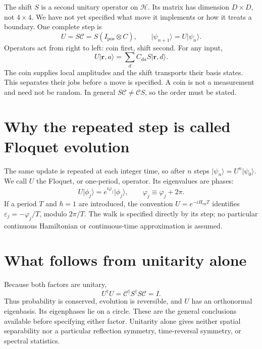 \documentclass[11pt,a4paper,oneside]{report}
\newcommand{\ket}[1]{\lvert #1\rangle}
\newcommand{\HH}{\mathcal H}
\newcommand{\CC}{\mathcal C}
\newcommand{\Id}{I}
\numberwithin{equation}{chapter}
\begin{document}
The shift \(S\) is a second unitary operator on \(\HH\). Its matrix
has dimension \(D\times D\), not \(4\times4\). We have not yet
specified what move it implements or how it treats a boundary.
One complete step is
\begin{equation}
\boxed{U=S\CC=S(\Id_{\mathrm{pos}}\otimes C),\qquad
\ket{\psi_{n+1}}=U\ket{\psi_n}.}
\label{eq:step}
\end{equation}
Operators act from right to left: coin first, shift second. For any input,
\begin{equation}
U\ket{\mathbf r,a}=\sum_d C_{da}S\ket{\mathbf r,d}.
\label{eq:componentstep}
\end{equation}
The coin supplies local amplitudes and the shift transports their basis
states. This separates their jobs before a move is specified. A coin
is not a measurement and need not be random.
In general \(S\CC\neq\CC S\), so the order must be stated.

\section{Why the repeated step is called Floquet evolution}

The same update is repeated at each integer time, so after \(n\)
steps \(\ket{\psi_n}=U^n\ket{\psi_0}\). We call \(U\) the
Floquet, or one-period, operator. Its eigenvalues are phases:
\begin{equation}
U\ket{\phi_j}=e^{i\varphi_j}\ket{\phi_j},\qquad
\varphi_j\equiv\varphi_j+2\pi.
\end{equation}
If a period \(T\) and \(\hbar=1\) are introduced, the convention
\(U=e^{-iH_{\mathrm{eff}}T}\) identifies
\(\varepsilon_j=-\varphi_j/T\), modulo \(2\pi/T\). The walk is
specified directly by its step; no particular continuous Hamiltonian
or continuous-time approximation is assumed.

\section{What follows from unitarity alone}

Because both factors are unitary,
\begin{equation}
U^\dagger U
=\CC^\dagger S^\dagger S\CC=\Id.
\end{equation}
Thus probability is conserved, evolution is reversible, and \(U\)
has an orthonormal eigenbasis. Its eigenphases lie on a circle.
These are the general conclusions available before specifying either
factor. Unitarity alone gives neither spatial separability nor a
particular reflection symmetry, time-reversal symmetry, or spectral
statistics.
\end{document}
